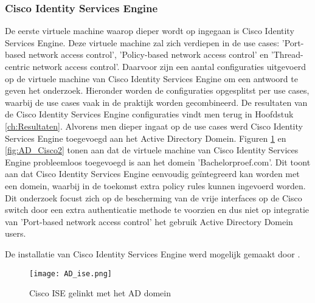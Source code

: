 \subsubsection{Cisco Identity Services Engine}
De eerste virtuele machine waarop dieper wordt op ingegaan is Cisco Identity Services Engine. Deze virtuele machine zal zich verdiepen in de use cases: 'Port-based network access control', 'Policy-based network access control' en 'Thread-centric network access control'. Daarvoor zijn een aantal configuraties uitgevoerd op de virtuele machine van Cisco Identity Services Engine om een antwoord te geven het onderzoek. Hieronder worden de configuraties opgesplitst per use cases, waarbij de use cases vaak in de praktijk worden gecombineerd. De resultaten van de Cisco Identity Services Engine configuraties vindt men terug in Hoofdstuk \ref{ch:Resultaten}.
\newline
\newline
Alvorens men dieper ingaat op de use cases werd Cisco Identity Services Engine toegevoegd aan het Active Directory Domein. Figuren \ref{fig:AD_Cisco1} en \ref{fig:AD_Cisco2} tonen aan dat de virtuele machine van Cisco Identity Services Engine probleemloos toegevoegd is aan het domein 'Bachelorproef.com'. Dit toont aan dat Cisco Identity Services Engine eenvoudig geïntegreerd kan worden met een domein, waarbij in de toekomst extra policy rules kunnen ingevoerd worden. Dit onderzoek focust zich op de bescherming van de vrije interfaces op de Cisco switch door een extra authenticatie methode te voorzien en dus niet op integratie van 'Port-based network access control' het gebruik Active Directory Domein users.

De installatie van Cisco Identity Services Engine werd mogelijk gemaakt door \cite{CiscoISE_InstallationGuide}.

\begin{figure}[H]
	\centering
	\texttt{[image: AD\_ise.png]}
	\caption{Cisco ISE gelinkt met het AD domein}%
	\label{fig:AD_Cisco1}%
\end{figure}

